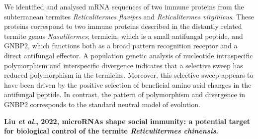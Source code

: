 \documentclass[11pt]{article}
\begin{document}
\begin{sloppypar}
We identified and analysed mRNA sequences of two immune proteins from the subterranean termites \textit{Reticulitermes flavipes} and \textit{Reticulitermes virginicus}. 
These proteins correspond to two immune proteins described in the distantly related termite genus \textit{Nasutitermes}; termicin, which is a small antifungal peptide, and GNBP2, which functions both as a broad pattern recognition receptor and a direct antifungal effector. 
A population genetic analysis of nucleotide intraspecific polymorphism and interspecific divergence indicates that a selective sweep has reduced polymorphism in the termicins. 
Moreover, this selective sweep appears to have been driven by the positive selection of beneficial amino acid changes in the antifungal peptide. 
In contrast, the pattern of polymorphism and divergence in GNBP2 corresponds to the standard neutral model of evolution.
\par
\textbf{Liu \textit{et al.}, 2022, microRNAs shape social immunity: a potential target for biological control of the termite \textit{Reticulitermes chinensis}.} \newline


\end{sloppypar}
\end{document}
